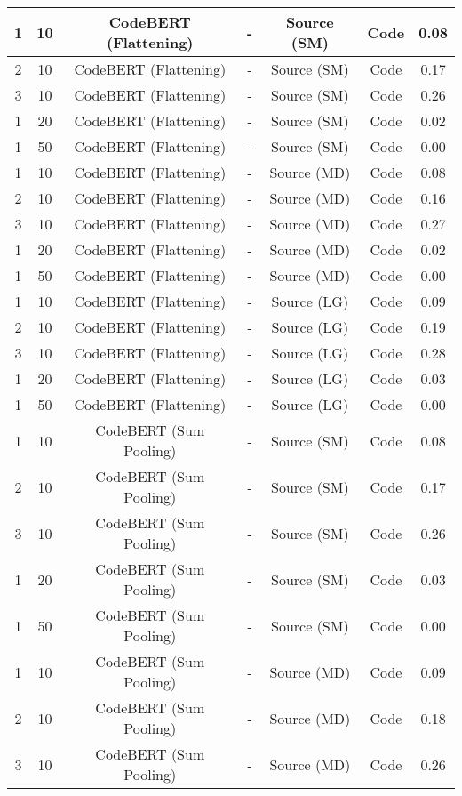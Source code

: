 \begin{longtable}{|c|c|c|c|c|c|c|}
\hline
1 & 10 & CodeBERT (Flattening) & - & Source (SM) & Code & 0.08 \\
\hline
2 & 10 & CodeBERT (Flattening) & - & Source (SM) & Code & 0.17 \\
\hline
3 & 10 & CodeBERT (Flattening) & - & Source (SM) & Code & 0.26 \\
\hline
1 & 20 & CodeBERT (Flattening) & - & Source (SM) & Code & 0.02 \\
\hline
1 & 50 & CodeBERT (Flattening) & - & Source (SM) & Code & 0.00 \\
\hline
1 & 10 & CodeBERT (Flattening) & - & Source (MD) & Code & 0.08 \\
\hline
2 & 10 & CodeBERT (Flattening) & - & Source (MD) & Code & 0.16 \\
\hline
3 & 10 & CodeBERT (Flattening) & - & Source (MD) & Code & 0.27 \\
\hline
1 & 20 & CodeBERT (Flattening) & - & Source (MD) & Code & 0.02 \\
\hline
1 & 50 & CodeBERT (Flattening) & - & Source (MD) & Code & 0.00 \\
\hline
1 & 10 & CodeBERT (Flattening) & - & Source (LG) & Code & 0.09 \\
\hline
2 & 10 & CodeBERT (Flattening) & - & Source (LG) & Code & 0.19 \\
\hline
3 & 10 & CodeBERT (Flattening) & - & Source (LG) & Code & 0.28 \\
\hline
1 & 20 & CodeBERT (Flattening) & - & Source (LG) & Code & 0.03 \\
\hline
1 & 50 & CodeBERT (Flattening) & - & Source (LG) & Code & 0.00 \\
\hline
1 & 10 & CodeBERT (Sum Pooling) & - & Source (SM) & Code & 0.08 \\
\hline
2 & 10 & CodeBERT (Sum Pooling) & - & Source (SM) & Code & 0.17 \\
\hline
3 & 10 & CodeBERT (Sum Pooling) & - & Source (SM) & Code & 0.26 \\
\hline
1 & 20 & CodeBERT (Sum Pooling) & - & Source (SM) & Code & 0.03 \\
\hline
1 & 50 & CodeBERT (Sum Pooling) & - & Source (SM) & Code & 0.00 \\
\hline
1 & 10 & CodeBERT (Sum Pooling) & - & Source (MD) & Code & 0.09 \\
\hline
2 & 10 & CodeBERT (Sum Pooling) & - & Source (MD) & Code & 0.18 \\
\hline
3 & 10 & CodeBERT (Sum Pooling) & - & Source (MD) & Code & 0.26 \\

\end{longtable}
